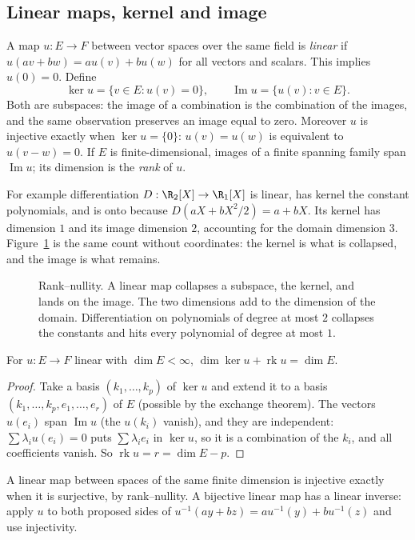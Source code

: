 \subsection*{Linear maps, kernel and image}
A map $u:E\to F$ between vector spaces over the same field is \emph{linear} if $u(av+bw)=au(v)+bu(w)$ for all vectors and scalars. This implies $u(0)=0$. Define
\[
\ker u=\{v\in E:u(v)=0\},\qquad \operatorname{Im}u=\{u(v):v\in E\}.
\]
Both are subspaces: the image of a combination is the combination of the images, and the same observation preserves an image equal to zero. Moreover $u$ is injective exactly when $\ker u=\{0\}$: $u(v)=u(w)$ is equivalent to $u(v-w)=0$. If $E$ is finite-dimensional, images of a finite spanning family span $\operatorname{Im}u$; its dimension is the \emph{rank} of $u$.

For example differentiation $D:\R_2[X]\to\R_1[X]$ is linear, has kernel the constant polynomials, and is onto because $D(aX+bX^2/2)=a+bX$. Its kernel has dimension $1$ and its image dimension $2$, accounting for the domain dimension $3$. Figure~\ref{fig:rank} is the same count without coordinates: the kernel is what is collapsed, and the image is what remains.

\begin{figure}[ht]
\centering
{}
\caption{Rank--nullity. A linear map collapses a subspace, the kernel, and lands on the image. The two dimensions add to the dimension of the domain. Differentiation on polynomials of degree at most $2$ collapses the constants and hits every polynomial of degree at most $1$.}
\label{fig:rank}
\end{figure}

\begin{proposition}\label{prop:ranknullity}
For $u:E\to F$ linear with $\dim E<\infty$, $\dim\ker u+\operatorname{rk}u=\dim E$.
\end{proposition}
\begin{proof}
Take a basis $(k_1,\dots,k_p)$ of $\ker u$ and extend it to a basis $(k_1,\dots,k_p,e_1,\dots,e_r)$ of $E$ (possible by the exchange theorem). The vectors $u(e_i)$ span $\operatorname{Im}u$ (the $u(k_i)$ vanish), and they are independent: $\sum\lambda_iu(e_i)=0$ puts $\sum\lambda_ie_i$ in $\ker u$, so it is a combination of the $k_i$, and all coefficients vanish. So $\operatorname{rk}u=r=\dim E-p$.
\end{proof}

A linear map between spaces of the same finite dimension is injective exactly when it is surjective, by rank--nullity. A bijective linear map has a linear inverse: apply $u$ to both proposed sides of $u^{-1}(ay+bz)=au^{-1}(y)+bu^{-1}(z)$ and use injectivity.

